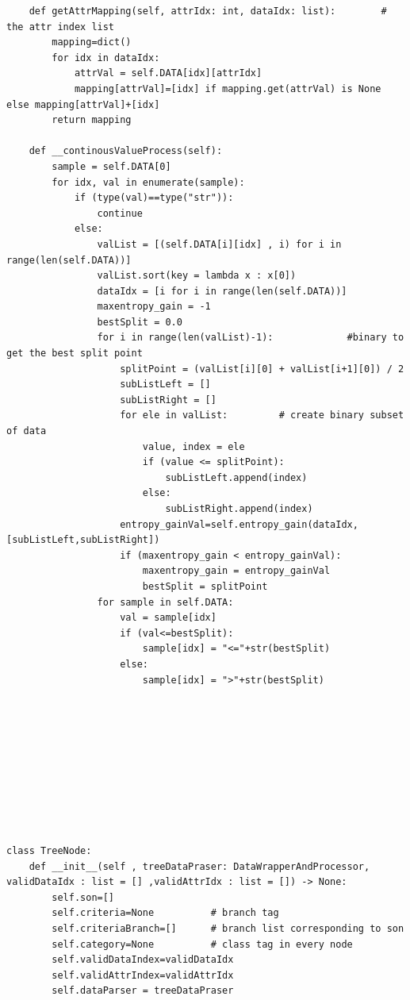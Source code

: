 \documentclass{ctexart}
\begin{document}
\begin{lstlisting}
    def getAttrMapping(self, attrIdx: int, dataIdx: list):        # the attr index list
        mapping=dict()
        for idx in dataIdx:
            attrVal = self.DATA[idx][attrIdx]
            mapping[attrVal]=[idx] if mapping.get(attrVal) is None else mapping[attrVal]+[idx]
        return mapping
    
    def __continousValueProcess(self):
        sample = self.DATA[0]
        for idx, val in enumerate(sample):
            if (type(val)==type("str")):
                continue
            else:
                valList = [(self.DATA[i][idx] , i) for i in range(len(self.DATA))]
                valList.sort(key = lambda x : x[0])
                dataIdx = [i for i in range(len(self.DATA))]
                maxentropy_gain = -1
                bestSplit = 0.0
                for i in range(len(valList)-1):             #binary to get the best split point
                    splitPoint = (valList[i][0] + valList[i+1][0]) / 2
                    subListLeft = []
                    subListRight = []
                    for ele in valList:         # create binary subset of data
                        value, index = ele
                        if (value <= splitPoint):
                            subListLeft.append(index)
                        else:
                            subListRight.append(index)
                    entropy_gainVal=self.entropy_gain(dataIdx, [subListLeft,subListRight])
                    if (maxentropy_gain < entropy_gainVal):
                        maxentropy_gain = entropy_gainVal
                        bestSplit = splitPoint
                for sample in self.DATA:
                    val = sample[idx]
                    if (val<=bestSplit):
                        sample[idx] = "<="+str(bestSplit)
                    else:
                        sample[idx] = ">"+str(bestSplit)










class TreeNode:
    def __init__(self , treeDataPraser: DataWrapperAndProcessor, validDataIdx : list = [] ,validAttrIdx : list = []) -> None:
        self.son=[]
        self.criteria=None          # branch tag
        self.criteriaBranch=[]      # branch list corresponding to son
        self.category=None          # class tag in every node
        self.validDataIndex=validDataIdx
        self.validAttrIndex=validAttrIdx
        self.dataParser = treeDataPraser
    

\end{lstlisting}
\end{document}
